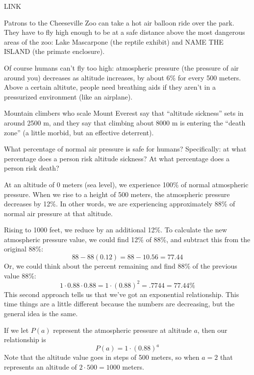 \begin{boxedexplore}
LINK
\end{boxedexplore}

\begin{boxedexplore}
Patrons to the Cheeseville Zoo can take a hot air balloon ride over the park. They have to fly high enough to be at a safe distance above the most dangerous areas of the zoo: Lake Mascarpone (the reptile exhibit) and NAME THE ISLAND (the primate enclosure).

Of course humans can't fly too high: atmospheric pressure (the pressure of air around you) decreases as altitude increases, by about 6\% for every 500 meters. Above a certain altitute, people need breathing aids if they aren't in a pressurized environment (like an airplane).

Mountain climbers who scale Mount Everest say that ``altitude sickness'' sets in around 2500 m, and they say that climbing about 8000 m is entering the ``death zone'' (a little morbid, but an effective deterrent).

What percentage of normal air pressure is safe for humans? Specifically: at what percentage does a person risk altitude sickness? At what percentage does a person risk death?

\end{boxedexplore}

At an altitude of 0 meters (sea level), we experience 100\% of normal atmospheric pressure. When we rise to a height of 500 meters, the atmospheric pressure decreases by 12\%. In other words, we are experiencing approximately 88\% of normal air pressure at that altitude.

Rising to 1000 feet, we reduce by an additional 12\%. To calculate the new atmospheric pressure value, we could find 12\% of 88\%, and subtract this from the original 88\%:
\[88 - 88(0.12) = 88 - 10.56 = 77.44\]
Or, we could think about the percent remaining and find 88\% of the previous value 88\%:
\[1\cdot0.88\cdot0.88 = 1\cdot(0.88)^2 = .7744 = 77.44\%\]
This second approach tells us that we've got an exponential relationship. This time things are a little different because the numbers are decreasing, but the general idea is the same.

If we let $P(a)$ represent the atmospheric pressure at altitude $a$, then our relationship is
\[P(a) = 1 \cdot (0.88)^a\]
Note that the altitude value goes in steps of 500 meters, so when $a=2$ that represents an altitude of $2\cdot500 = 1000$ meters.

